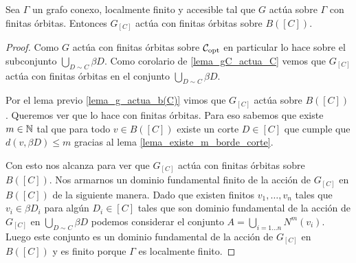 \documentclass[tesis.tex]{subfiles}
\begin{document}
\begin{lema}\label{lema_accion_b(C)}
	Sea $\Gamma$ un grafo conexo, localmente finito y accesible tal que $G$ actúa sobre $\Gamma$ con finitas órbitas.
	Entonces $G_{[C]}$ actúa con finitas órbitas sobre $B([C])$.
\end{lema}
\begin{proof}
	Como $G$ actúa con finitas órbitas sobre ${\cal C}_{\text{opt}}$ en particular lo hace sobre el subconjunto $\bigcup_{D \sim C} \beta D$.
	Como corolario de \ref{lema_gC_actua_C} vemos que $G_{[C]}$ actúa con finitas órbitas en el conjunto $ \bigcup_{D \sim C} \beta D $.
	
	Por el lema previo \ref{lema_g_actua_b(C)} vimos que $G_{[C]}$ actúa sobre $B([C])$.
	Queremos ver que lo hace con finitas órbitas.
	Para eso sabemos que existe $m \in \mathbb{N}$ tal que para todo $v \in B([C])$ existe un corte $D \in [C]$ que cumple que
	$d(v,\beta D) \le m$ gracias al lema \ref{lema_existe_m_borde_corte}.
	
	Con esto nos alcanza para ver que $G_{[C]}$ actúa con finitas órbitas sobre $B([C])$.
	Nos armarnos un dominio fundamental finito de la acción de $G_{[C]}$ en $B([C])$ de la siguiente manera.
	Dado que existen finitos $v_{1}, \dots, v_{n}$ tales que $v_{i} \in \beta D_{i}$ para algún $D_{i} \in [C]$ tales que son dominio fundamental de la acción de $G_{[C]}$ en $\bigcup_{D \sim C} \beta D$ podemos considerar el conjunto 
	$A  = \bigcup_{i=1 \dots n} N^m(v_{i})$. 
	Luego este conjunto es un dominio fundamental de la acción de $G_{[C]}$ en $B([C])$ y es finito porque $\Gamma$ es localmente finito.
\end{proof}
\end{document}
